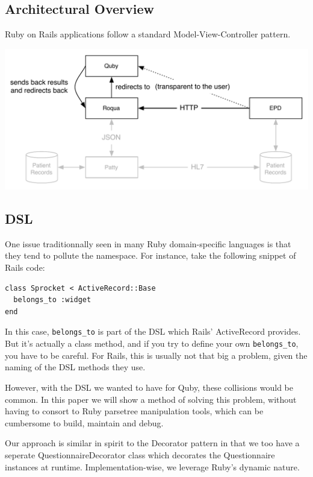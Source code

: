 \documentclass[10pt,fleqn,a4paper]{article}
\begin{document}
\begin{twocolumn}
\section{Architectural Overview}

Ruby on Rails applications follow a standard Model-View-Controller
pattern.

\includegraphics{quby-in-its-setting.pdf}

\subsection{DSL}

One issue traditionnally seen in many Ruby domain-specific languages
is that they tend to pollute the namespace. For instance, take the
following snippet of Rails code:

\begin{lstlisting}
class Sprocket < ActiveRecord::Base
  belongs_to :widget
end
\end{lstlisting}

In this case, \lstinline{belongs_to} is part of the DSL which Rails'
ActiveRecord provides. But it's actually a class method, and if you
try to define your own \lstinline{belongs_to}, you have to be
careful. For Rails, this is usually not that big a problem, given the
naming of the DSL methods they use.

However, with the DSL we wanted to have for Quby, these collisions
would be common. In this paper we will show a method of solving this
problem, without having to consort to Ruby parsetree manipulation
tools, which can be cumbersome to build, maintain and debug.

Our approach is similar in spirit to the Decorator
pattern\cite{Erich:1995design} in that we too have a seperate
Questionnaire\-Decorator class which decorates the Questionnaire
instances at runtime. Implementation-wise, we leverage Ruby's dynamic
nature.


\end{twocolumn}
\end{document}
